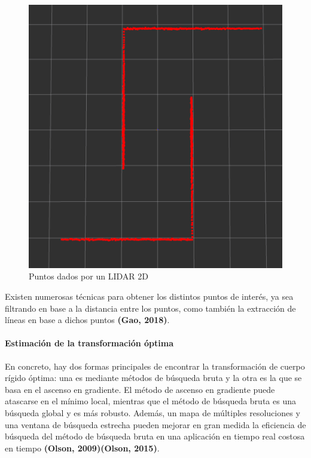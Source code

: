 \begin{figure}[!ht]
    \centering
    \includegraphics[width=0.75\linewidth]{Img/LIDAR2DPoints.png}
    \caption{Puntos dados por un LIDAR 2D}
    \label{fig:lidar2dpoints}
\end{figure}

Existen numerosas técnicas para obtener los distintos puntos de interés, ya sea filtrando en base a la distancia entre los puntos, como también la extracción de líneas en base a dichos puntos \textbf{(Gao, 2018)}.

\paragraph{Estimación de la transformación óptima}
En concreto, hay dos formas principales de encontrar la transformación de cuerpo rígido óptima: una es mediante métodos de búsqueda bruta y la otra es la que se basa en el ascenso en gradiente. El método de ascenso en gradiente puede atascarse en el mínimo local, mientras que el método de búsqueda bruta es una búsqueda global y es más robusto. Además, un mapa de múltiples resoluciones y una ventana de búsqueda estrecha pueden mejorar en gran medida la eficiencia de búsqueda del método de búsqueda bruta en una aplicación en tiempo real costosa en tiempo \textbf{(Olson, 2009)(Olson, 2015)}.

